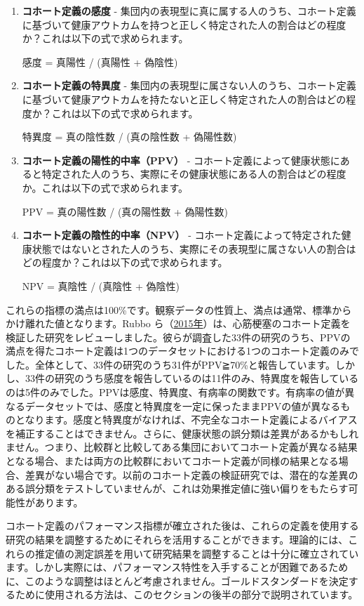 \documentclass[
  11pt]{book}
\theoremstyle{definition}
\theoremstyle{definition}
\theoremstyle{definition}
\theoremstyle{definition}
\theoremstyle{remark}
\begin{document}
\begin{enumerate}
\def\labelenumi{\arabic{enumi}.}
\item
  \textbf{コホート定義の感度} - 集団内の表現型に真に属する人のうち、コホート定義に基づいて健康アウトカムを持つと正しく特定された人の割合はどの程度か？これは以下の式で求められます。

  感度 = 真陽性 / (真陽性 + 偽陰性)
\item
  \textbf{コホート定義の特異度} - 集団内の表現型に属さない人のうち、コホート定義に基づいて健康アウトカムを持たないと正しく特定された人の割合はどの程度か？これは以下の式で求められます。

  特異度 = 真の陰性数 / (真の陰性数 + 偽陽性数)
\item
  \textbf{コホート定義の陽性的中率（PPV）} - コホート定義によって健康状態にあると特定された人のうち、実際にその健康状態にある人の割合はどの程度か。これは以下の式で求められます。

  PPV = 真の陽性数 / (真の陽性数 + 偽陽性数)
\item
  \textbf{コホート定義の陰性的中率（NPV）} - コホート定義によって特定された健康状態ではないとされた人のうち、実際にその表現型に属さない人の割合はどの程度か？これは以下の式で求められます。

  NPV = 真陰性 / (真陰性 + 偽陰性)
\end{enumerate}

これらの指標の満点は100\%です。観察データの性質上、満点は通常、標準からかけ離れた値となります。Rubbo ら（\href{https://ohdsi.github.io/TheBookOfOhdsi/ClinicalValidity.html\#ref-Rubbo2015phenotypes}{2015年}）は、心筋梗塞のコホート定義を検証した研究をレビューしました。彼らが調査した33件の研究のうち、PPVの満点を得たコホート定義は1つのデータセットにおける1つのコホート定義のみでした。全体として、33件の研究のうち31件がPPV≧70\%と報告しています。しかし、33件の研究のうち感度を報告しているのは11件のみ、特異度を報告しているのは5件のみでした。PPVは感度、特異度、有病率の関数です。有病率の値が異なるデータセットでは、感度と特異度を一定に保ったままPPVの値が異なるものとなります。感度と特異度がなければ、不完全なコホート定義によるバイアスを補正することはできません。さらに、健康状態の誤分類は差異があるかもしれません。つまり、比較群と比較してある集団においてコホート定義が異なる結果となる場合、または両方の比較群においてコホート定義が同様の結果となる場合、差異がない場合です。以前のコホート定義の検証研究では、潜在的な差異のある誤分類をテストしていませんが、これは効果推定値に強い偏りをもたらす可能性があります。

コホート定義のパフォーマンス指標が確立された後は、これらの定義を使用する研究の結果を調整するためにそれらを活用することができます。理論的には、これらの推定値の測定誤差を用いて研究結果を調整することは十分に確立されています。しかし実際には、パフォーマンス特性を入手することが困難であるために、このような調整はほとんど考慮されません。ゴールドスタンダードを決定するために使用される方法は、このセクションの後半の部分で説明されています。
\end{document}

